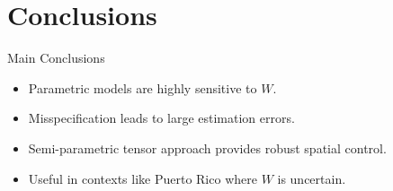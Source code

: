 \documentclass[11pt]{beamer}
\begin{document}
\section{Conclusions}

\begin{frame}{Main Conclusions}

	\begin{itemize}
		\item Parametric models are highly sensitive to $W$.
		\item Misspecification leads to large estimation errors.
		\item Semi-parametric tensor approach provides robust spatial control.
		\item Useful in contexts like Puerto Rico where $W$ is uncertain.
	\end{itemize}

\end{frame}
\end{document}
